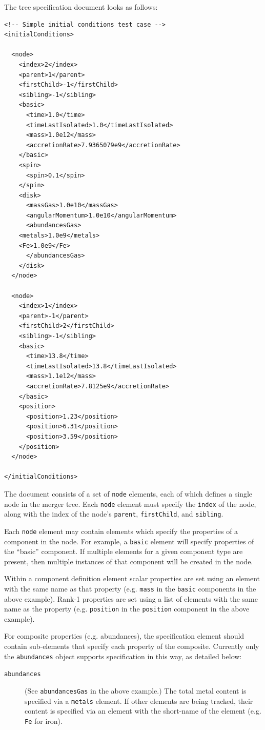 The tree specification document looks as follows:
\begin{verbatim}
<!-- Simple initial conditions test case -->
<initialConditions>

  <node>
    <index>2</index>
    <parent>1</parent>
    <firstChild>-1</firstChild>
    <sibling>-1</sibling>
    <basic>
      <time>1.0</time>
      <timeLastIsolated>1.0</timeLastIsolated>
      <mass>1.0e12</mass>
      <accretionRate>7.9365079e9</accretionRate>
    </basic>
    <spin>
      <spin>0.1</spin>
    </spin>
    <disk>
      <massGas>1.0e10</massGas>
      <angularMomentum>1.0e10</angularMomentum>
      <abundancesGas>
	<metals>1.0e9</metals>
	<Fe>1.0e9</Fe>
      </abundancesGas>
    </disk>
  </node>

  <node>
    <index>1</index>
    <parent>-1</parent>
    <firstChild>2</firstChild>
    <sibling>-1</sibling>
    <basic>
      <time>13.8</time>
      <timeLastIsolated>13.8</timeLastIsolated>
      <mass>1.1e12</mass>
      <accretionRate>7.8125e9</accretionRate>
    </basic>
    <position>
      <position>1.23</position>
      <position>6.31</position>
      <position>3.59</position>
    </position>
  </node>

</initialConditions>
\end{verbatim}
The document consists of a set of {\tt node} elements, each of which defines a single node in the merger tree. Each {\tt node} element must specify the {\tt index} of the node, along with the index of the node's {\tt parent}, {\tt firstChild}, and {\tt sibling}. 

Each {\tt node} element may contain elements which specify the properties of a component in the node. For example, a {\tt basic} element will specify properties of the ``basic'' component. If multiple elements for a given component type are present, then multiple instances of that component will be created in the node.

Within a component definition element scalar properties are set using an element with the same name as that property (e.g. {\tt mass} in the {\tt basic} components in the above example). Rank-1 properties are set using a list of elements with the same name as the property (e.g. {\tt position} in the {\tt position} component in the above example).

For composite properties (e.g. abundances), the specification element should contain sub-elements that specify each property of the composite. Currently only the {\tt abundances} object supports specification in this way, as detailed below:
\begin{description}
 \item [{\tt abundances}] (See {\tt abundancesGas} in the above example.) The total metal content is specified via a {\tt metals} element. If other elements are being tracked, their content is specified via an element with the short-name of the element (e.g. {\tt Fe} for iron).
\end{description}

